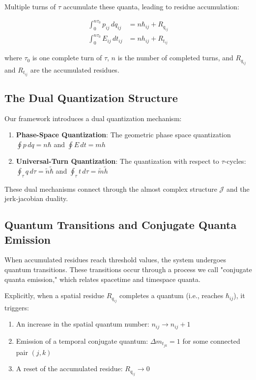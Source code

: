 \documentclass{article}
\begin{document}
Multiple turns of $\tau$ accumulate these quanta, leading to residue accumulation:

\begin{align}
\int_{0}^{n\tau_0} p_{ij} \, dq_{ij} &= n \hbar_{ij} + R_{q_{ij}} \\
\int_{0}^{n\tau_0} E_{ij} \, dt_{ij} &= n h_{ij} + R_{t_{ij}}
\end{align}

where $\tau_0$ is one complete turn of $\tau$, $n$ is the number of completed turns, and $R_{q_{ij}}$ and $R_{t_{ij}}$ are the accumulated residues.

\subsection{The Dual Quantization Structure}

Our framework introduces a dual quantization mechanism:

\begin{enumerate}
\item \textbf{Phase-Space Quantization}: The geometric phase space quantization $\oint p \, dq = n\hbar$ and $\oint E \, dt = mh$
\item \textbf{Universal-Turn Quantization}: The quantization with respect to $\tau$-cycles: $\oint_\tau q \, d\tau = \tilde{n}\tilde{\hbar}$ and $\oint_\tau t \, d\tau = \tilde{m}\tilde{h}$
\end{enumerate}

These dual mechanisms connect through the almost complex structure $\mathcal{J}$ and the jerk-jacobian duality.

\subsection{Quantum Transitions and Conjugate Quanta Emission}

When accumulated residues reach threshold values, the system undergoes quantum transitions. These transitions occur through a process we call "conjugate quanta emission," which relates spacetime and timespace quanta.

Explicitly, when a spatial residue $R_{q_{ij}}$ completes a quantum (i.e., reaches $\hbar_{ij}$), it triggers:
\begin{enumerate}
\item An increase in the spatial quantum number: $n_{ij} \rightarrow n_{ij} + 1$
\item Emission of a temporal conjugate quantum: $\Delta m_{t_{jk}} = 1$ for some connected pair $(j,k)$
\item A reset of the accumulated residue: $R_{q_{ij}} \rightarrow 0$
\end{enumerate}
\end{document}
